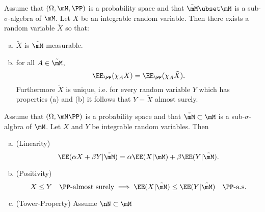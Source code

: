 \documentclass{article}
\begin{document}
 Assume that $(\Omega, \mM, \PP)$ is a probability space and that $\tilde \mM \ubset \mM$ is a sub-$\sigma$-algebra of $\mM$. Let $X$ be an integrable random variable. Then there exists a random variable $\tilde X$ so that:
\begin{enumerate}[a)]
\item $\tilde X$ is $\tilde \mM$-measurable.
\item for all $A \in \tilde \mM$,
$$\EE_\PP(\chi_A X) = \EE_\PP(\chi_A \tilde X).$$
Furthermore $\tilde X$ is unique, i.e. for every random variable $Y$ which has properties (a) and (b) it follows that $Y = \tilde X$ almost surely.
\end{enumerate}

 Assume that $(\Omega, \mM \PP)$ is a probability space and that $\tilde \mM \subset \mM$ is a sub-$\sigma$-algbra of $\mM$. Let $X$ and $Y$ be integrable random variables. Then
\begin{enumerate}[a)]
\item (Linearity)
$$\EE(\alpha X + \beta Y | \tilde \mM) = \alpha \EE(X | \mM) + \beta \EE(Y | \tilde \mM).$$
\item (Positivity)
$$X \le Y \quad \text{$\PP$-almost surely} \implies \EE(X | \tilde \mM) \le \EE(Y | \tilde \mM) \quad \text{$\PP$-a.s.}$$
\item (Tower-Property) Assume $\nN \subset \mM$
\end{enumerate}
\end{document}
